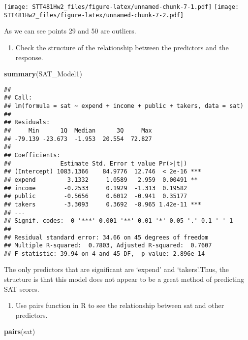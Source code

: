 \documentclass[]{article}
\newenvironment{Shaded}{\begin{snugshade}}{\end{snugshade}}
\newcommand{\KeywordTok}[1]{\textcolor[rgb]{0.13,0.29,0.53}{\textbf{#1}}}
\newcommand{\NormalTok}[1]{#1}
\providecommand{\tightlist}{%
  \setlength{\itemsep}{0pt}\setlength{\parskip}{0pt}}
\begin{document}
\texttt{[image: STT481Hw2\_files/figure-latex/unnamed-chunk-7-1.pdf]}
\texttt{[image: STT481Hw2\_files/figure-latex/unnamed-chunk-7-2.pdf]}

As we can see points 29 and 50 are outliers.

\begin{enumerate}
\def\labelenumi{(\alph{enumi})}
\setcounter{enumi}{4}
\tightlist
\item
  Check the structure of the relationship between the predictors and the
  response.
\end{enumerate}

\begin{Shaded}
\begin{Highlighting}[]
\KeywordTok{summary}\NormalTok{(SAT_Model1)}
\end{Highlighting}
\end{Shaded}

\begin{verbatim}
## 
## Call:
## lm(formula = sat ~ expend + income + public + takers, data = sat)
## 
## Residuals:
##     Min      1Q  Median      3Q     Max 
## -79.139 -23.673  -1.953  20.554  72.827 
## 
## Coefficients:
##              Estimate Std. Error t value Pr(>|t|)    
## (Intercept) 1083.1366    84.9776  12.746  < 2e-16 ***
## expend         3.1332     1.0589   2.959  0.00491 ** 
## income        -0.2533     0.1929  -1.313  0.19582    
## public        -0.5656     0.6012  -0.941  0.35177    
## takers        -3.3093     0.3692  -8.965 1.42e-11 ***
## ---
## Signif. codes:  0 '***' 0.001 '**' 0.01 '*' 0.05 '.' 0.1 ' ' 1
## 
## Residual standard error: 34.66 on 45 degrees of freedom
## Multiple R-squared:  0.7803, Adjusted R-squared:  0.7607 
## F-statistic: 39.94 on 4 and 45 DF,  p-value: 2.896e-14
\end{verbatim}

The only predictors that are significant are `expend' and `takers'.Thus,
the structure is that this model does not appear to be a great method of
predicting SAT scores.

\begin{enumerate}
\def\labelenumi{(\alph{enumi})}
\setcounter{enumi}{5}
\tightlist
\item
  Use pairs function in R to see the relationship between sat and other
  predictors.
\end{enumerate}

\begin{Shaded}
\begin{Highlighting}[]
\KeywordTok{pairs}\NormalTok{(sat)}
\end{Highlighting}
\end{Shaded}
\end{document}
